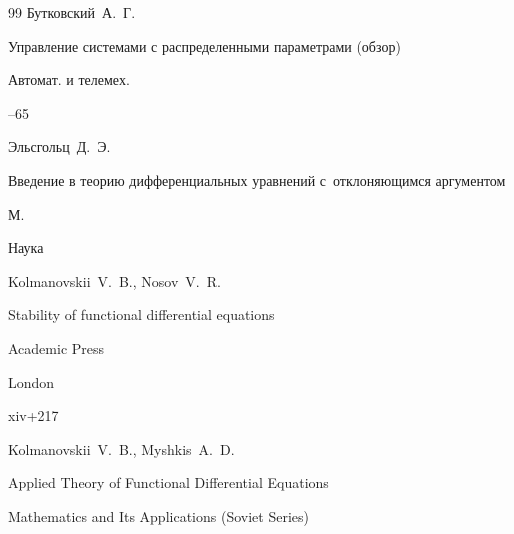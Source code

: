 \begin{thebibliography}{99}
\by Бутковский~А.~Г.

\paper Управление системами с распределенными параметрами (обзор)

\jour Автомат. и телемех.



--65

















\by Эльсгольц~Д.~Э.

\book Введение в теорию дифференциальных уравнений с~отклоняющимся аргументом

\publaddr М.

\publ  Наука








\by Kolmanovskii~V.~B., Nosov~V.~R.

\book Stability of functional differential equations

\publ Academic Press

\publaddr London


\totalpages xiv+217







\by Kolmanovskii~V.~B., Myshkis~A.~D.

\book  Applied Theory of Functional Differential Equations

\serial Mathematics and Its Applications (Soviet Series)


\end{thebibliography}

